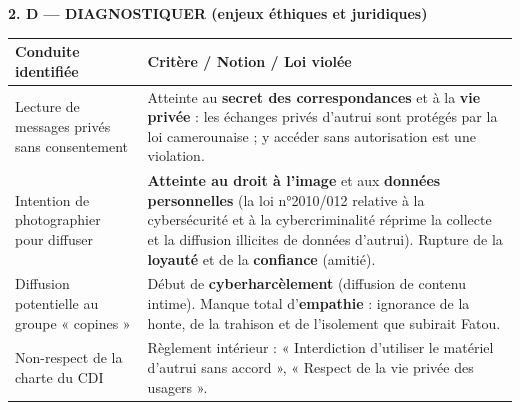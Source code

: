 \documentclass[11pt]{article}
\begin{document}
\begin{experience}
\noindent\textbf{2. D — DIAGNOSTIQUER (enjeux éthiques et juridiques)}
\begin{center}
\begin{tabularx}{\linewidth}{|l|X|}\hline
\textbf{Conduite identifiée} & \textbf{Critère / Notion / Loi violée} \\\hline
Lecture de messages privés sans consentement & Atteinte au \textbf{secret des correspondances} et à la \textbf{vie privée} : les échanges privés d'autrui sont protégés par la loi camerounaise ; y accéder sans autorisation est une violation. \\\hline
Intention de photographier pour diffuser & \textbf{Atteinte au droit à l'image} et aux \textbf{données personnelles} (la loi n°2010/012 relative à la cybersécurité et à la cybercriminalité réprime la collecte et la diffusion illicites de données d'autrui). Rupture de la \textbf{loyauté} et de la \textbf{confiance} (amitié). \\\hline
Diffusion potentielle au groupe « copines » & Début de \textbf{cyberharcèlement} (diffusion de contenu intime). Manque total d'\textbf{empathie} : ignorance de la honte, de la trahison et de l'isolement que subirait Fatou. \\\hline
Non-respect de la charte du CDI & Règlement intérieur : « Interdiction d'utiliser le matériel d'autrui sans accord », « Respect de la vie privée des usagers ». \\\hline
\end{tabularx}
\end{center}


\end{experience}
\end{document}

